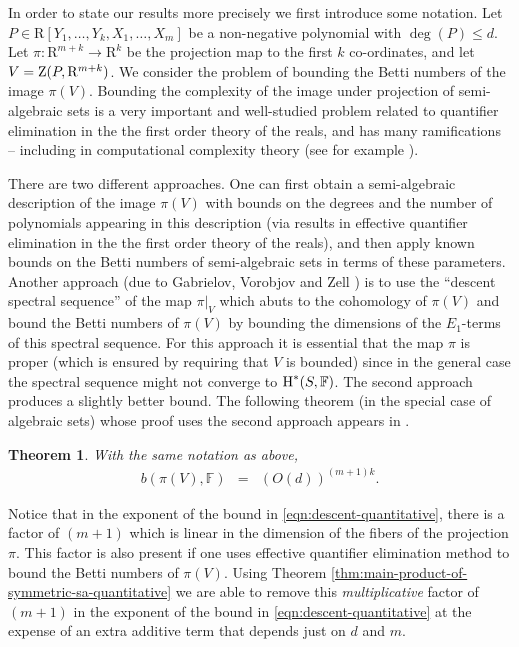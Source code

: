 \documentclass{amsart}
\newtheorem{theorem}{Theorem}
\theoremstyle{definition}
\theoremstyle{remark}
\numberwithin{equation}{section}
\begin{document}
In order to state our results more precisely we first introduce some notation.
Let 
$P \in {\mathrm{R}} [ Y_{1} , \ldots ,Y_{k} ,X_{1} , \ldots ,X_{m}]$ be a non-negative polynomial with 
$\deg ( P ) \leq d$.
Let $\pi : {\mathrm{R}}^{m+k}
\longrightarrow {\mathrm{R}}^{k}$ be the projection map to the first $k$ co-ordinates,
and let 
$V = {{\rm Z}}(P,{\mathrm{R}}^{m+k})$.
We
consider the problem of bounding the Betti numbers of the image 
$\pi(V)$.
Bounding the complexity of the image under projection of semi-algebraic sets is a very
important and well-studied problem related to quantifier elimination in the the first order
theory of the reals, and has many ramifications -- including in computational
complexity theory (see for example \cite{Basu-sheaf}).

There are two different approaches. One can first obtain a semi-algebraic
description of the image 
$\pi(V)$
with bounds on the degrees and the number
of polynomials appearing in this description (via results in effective quantifier elimination in the
the first order theory of the reals), and then apply known bounds on
the Betti numbers of semi-algebraic sets in terms of these parameters. Another
approach (due to Gabrielov, Vorobjov and Zell \cite{GVZ04}) 
is to use the ``descent spectral sequence'' of the map 
$\pi |_{V}$
which abuts to the cohomology of 
$\pi ( V )$
and bound the Betti numbers of
$\pi ( V )$
by bounding the dimensions of the $E_{1}$-terms of this spectral
sequence. 
For this approach it is essential that 
the map $\pi$ is proper (which is ensured by requiring that 
$V$
is 
bounded)
since in the general case the spectral sequence might not converge to ${\mbox{\rm H}}^*(S,{\mathbb{F}})$. The second approach produces a slightly better bound. The following
theorem (in the special case of algebraic sets) whose proof uses the second approach appears in {\cite{GVZ04}}.

\begin{theorem} \cite{GVZ04}
  \label{thm:descent-quantitative} 
With the same notation as above,
  \begin{eqnarray}
  \label{eqn:descent-quantitative}
    b ( \pi ( V ) ,{\mathbb{F}} ) & = & ( O ( d ) )^{( m+1 ) k} .
  \end{eqnarray}
\end{theorem}

Notice that in the exponent of the bound in  \eqref{eqn:descent-quantitative}, there is a 
factor of $(m+1)$ which is linear in the dimension of the fibers of the projection $\pi$.
This factor is also present if one uses effective quantifier elimination method to bound the Betti numbers of 
$\pi(V)$.
  Using Theorem \ref{thm:main-product-of-symmetric-sa-quantitative} we are able to remove this \emph{multiplicative} factor of $(m+1)$ in the exponent of the bound in 
\eqref{eqn:descent-quantitative}
at the expense of an extra additive term that depends just  on $d$ and $m$.
\end{document}
